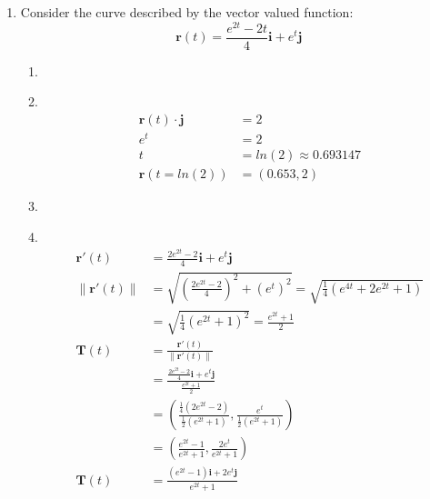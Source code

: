 \documentclass[11pt]{article}
\newcommand\Item[1][]{%
  \ifx\relax#1\relax  \item \else \item[#1] \fi
  \abovedisplayskip=0pt\abovedisplayshortskip=0pt~\vspace*{-\baselineskip}}
\begin{document}
\begin{enumerate}
\begin{enumerate}
          \end{enumerate}
    \item Consider the curve described by the vector valued function:\\
          $$\textbf{r}(t) = \frac{e^{2t}-2t}{4}\textbf{i} + e^t\textbf{j}$$
          \begin{enumerate}
              \Item
              \begin{align*}
                  \textbf{r}(t){\cdot}\textbf{j} & =2                       \\
                  e^t                            & = 2                      \\
                  t                              & = ln(2) \approx 0.693147 \\
                  \textbf{r}\left(t=ln(2)\right) & = (0.653,2)
              \end{align*}

              \Item
              \begin{align*}
                  \textbf{r}'(t)       & = \frac{2e^{2t} - 2}{4}\textbf{i} + e^t\textbf{j}                                                                                        \\
                  \| \textbf{r}'(t) \| & = \sqrt{\left(\frac{2e^{2t} - 2}{4}\right)^2 + (e^t)^2} = \sqrt{\frac{1}{4}(e^{4t}+2e^{2t}+1)}                                                                                 \\
                                       & = \sqrt{\frac{1}{4}(e^{2t}+1)^{2}} = \frac{e^{2t}+1}{2}                                                                                                                     \\
                  \textbf{T}(t)        & = \frac{\textbf{r}'(t)}{\| \textbf{r}'(t) \|}                                                                                            \\
                                       & =         \frac{\frac{2e^{2t} - 2}{4}\textbf{i} + e^t\textbf{j}}{\frac{e^{2t}+1}{2}}                                                     \\
                                       & = \left(\frac{\frac{1}{4}\left(2e^{2t}-2\right)}{\frac{1}{2}\left(e^{2t}+1\right)},\frac{e^{t}}{\frac{1}{2}\left(e^{2t}+1\right)}\right) \\
                                       & = \left(\frac{e^{2t}-1}{e^{2t}+1},\frac{2e^{t}}{e^{2t}+1}\right)                                                                         \\
                  \textbf{T}(t)        & = \frac{(e^{2t}-1)\textbf{i} + 2e^t\textbf{j}}{e^{2t}+1}
              \end{align*}


\end{enumerate}
\end{enumerate}
\end{document}
